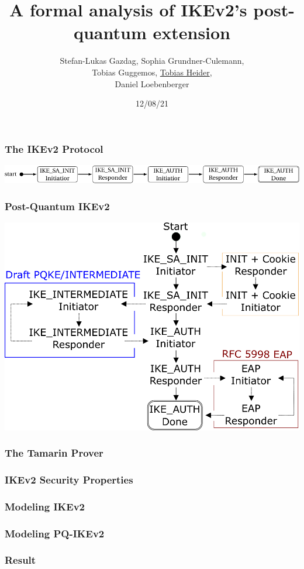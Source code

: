\documentclass{beamer}
\title{A formal analysis of IKEv2's post-quantum extension}
\author{Stefan-Lukas Gazdag, Sophia Grundner-Culemann,\\
    Tobias Guggemos, \underline{Tobias Heider},\\
    Daniel Loebenberger}
\institute{ACSAC2021}
\date{12/08/21}
\begin{document}
\begin{frame}
	\titlepage
\end{frame}

\begin{frame}
\frametitle{The IKEv2 Protocol}
\includegraphics[width=\textwidth]{ike-state-machine.pdf}
\end{frame}

\begin{frame}
\frametitle{Post-Quantum IKEv2}
\includegraphics[width=\textwidth]{statemachine.pdf}
\end{frame}

\begin{frame}
\frametitle{The Tamarin Prover}
\end{frame}

\begin{frame}
\frametitle{IKEv2 Security Properties}
\end{frame}

\begin{frame}
\frametitle{Modeling IKEv2}
\end{frame}

\begin{frame}
	\frametitle{Modeling PQ-IKEv2}
\end{frame}

\begin{frame}
\frametitle{Result}
\end{frame}
\end{document}
